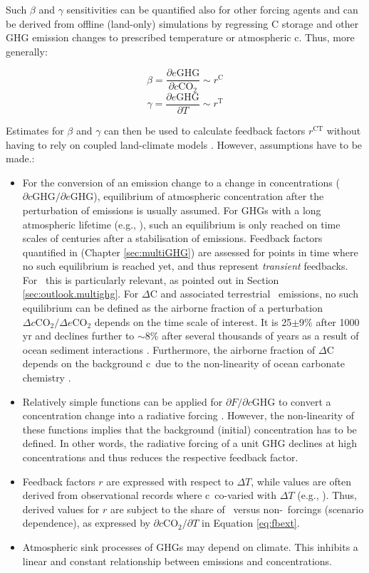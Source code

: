 Such $\beta$ and $\gamma$ sensitivities can be quantified also for other forcing agents and can be derived from offline (land-only) simulations by regressing C storage and other GHG emission changes to prescribed temperature or atmospheric c\coo. Thus, more generally:

\begin{equation}
  \beta  = \frac{\partial e\text{GHG}}{\partial c\text{CO}_2} \sim r^{\text{C}}
\end{equation}
\begin{equation}
  \gamma = \frac{\partial e\text{GHG}}{\partial T}            \sim  r^{\text{T}}
\end{equation}

Estimates for $\beta$ and $\gamma$ can then be used to calculate feedback factors $r^{\text{CT}}$ without having to rely on coupled land-climate models \citep{arneth10ngeo}. However, assumptions have to be made.:
\begin{itemize}
\item For the conversion of an emission change to a change in concentrations ($\partial c\text{GHG}/\partial e\text{GHG}$), equilibrium of atmospheric concentration after the perturbation of emissions is usually assumed. For GHGs with a long atmospheric lifetime (e.g., \nno ), such an equilibrium is only reached on time scales of centuries after a stabilisation of emissions. Feedback factors quantified in \citet{stocker13natcc} (Chapter \ref{sec:multiGHG}) are assessed for points in time where no such equilibrium is reached yet, and thus represent {\it transient} feedbacks. For \nno\ this is particularly relevant, as pointed out in Section \ref{sec:outlook.multighg}. For $\Delta$C and associated terrestrial \coo\ emissions, no such equilibrium can be defined as the airborne fraction of a perturbation $\Delta c\text{CO}_2/\Delta e\text{CO}_2$ depends on the time scale of interest. It is 25$\pm$9\% after 1000 yr \citep{joos13} and declines further to $\sim$8\% after several thousands of years as a result of ocean sediment interactions \citep{archer97grl}. Furthermore, the airborne fraction of $\Delta$C depends on the background c\coo\ due to the non-linearity of ocean carbonate chemistry \citep{joos13}. 
\item Relatively simple functions can be applied for $\partial F/\partial c\text{GHG}$ to convert a concentration change into a radiative forcing \citep{joos01gbc}. However, the non-linearity of these functions implies that the background (initial) concentration has to be defined. In other words, the radiative forcing of a unit GHG declines at high concentrations and thus reduces the respective feedback factor.
\item Feedback factors $r$ are expressed with respect to $\Delta T$, while values are often derived from observational records where c\coo\ co-varied with $\Delta T$ (e.g., \citet{tornharte06grl}). Thus, derived values for $r$ are subject to the share of \coo\ versus non-\coo\ forcings (scenario dependence), as expressed by $\partial c\text{CO}_2/\partial T$ in Equation \ref{eq:fbext}. 
\item Atmospheric sink processes of GHGs may depend on climate. This inhibits a linear and constant relationship between emissions and concentrations.
\end{itemize}
